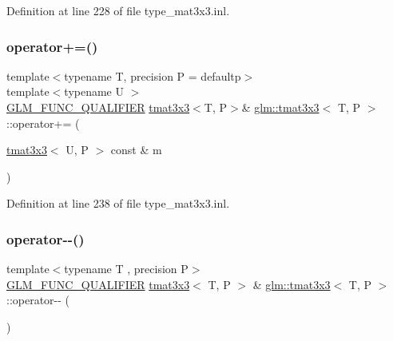 Definition at line 228 of file type\+\_\+mat3x3.\+inl.

\mbox{\label{structglm_1_1tmat3x3_a767f25ce5e8dfe01f93427ab11f66b68}} 
\subsubsection{\texorpdfstring{operator+=()}{operator+=()}\hspace{0.1cm}{\footnotesize\ttfamily [4/4]}}
{\footnotesize\ttfamily template$<$typename T, precision P = defaultp$>$ \\
template$<$typename U $>$ \\
\mbox{\hyperlink{setup_8hpp_a33fdea6f91c5f834105f7415e2a64407}{G\+L\+M\+\_\+\+F\+U\+N\+C\+\_\+\+Q\+U\+A\+L\+I\+F\+I\+ER}} \mbox{\hyperlink{structglm_1_1tmat3x3}{tmat3x3}}$<$T, P$>$\& \mbox{\hyperlink{structglm_1_1tmat3x3}{glm\+::tmat3x3}}$<$ T, P $>$\+::operator+= (\begin{DoxyParamCaption}\item[{\mbox{\hyperlink{structglm_1_1tmat3x3}{tmat3x3}}$<$ U, P $>$ const \&}]{m }\end{DoxyParamCaption})}



Definition at line 238 of file type\+\_\+mat3x3.\+inl.

\mbox{\label{structglm_1_1tmat3x3_ae5483abbd6a2e5d7698aa6cbd0e1f8c8}} 
\subsubsection{\texorpdfstring{operator-\/-\/()}{operator--()}\hspace{0.1cm}{\footnotesize\ttfamily [1/2]}}
{\footnotesize\ttfamily template$<$typename T , precision P$>$ \\
\mbox{\hyperlink{setup_8hpp_a33fdea6f91c5f834105f7415e2a64407}{G\+L\+M\+\_\+\+F\+U\+N\+C\+\_\+\+Q\+U\+A\+L\+I\+F\+I\+ER}} \mbox{\hyperlink{structglm_1_1tmat3x3}{tmat3x3}}$<$ T, P $>$ \& \mbox{\hyperlink{structglm_1_1tmat3x3}{glm\+::tmat3x3}}$<$ T, P $>$\+::operator-\/-\/ (\begin{DoxyParamCaption}{ }\end{DoxyParamCaption})}



